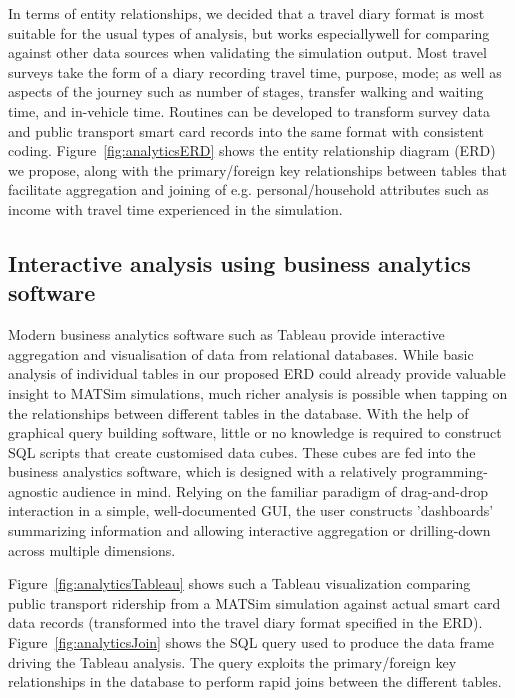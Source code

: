 In terms of entity relationships, we decided that a travel diary format is most suitable for the usual types of analysis, but works especiallywell for comparing against other data sources when validating the simulation output. Most travel surveys take the form of a diary recording travel time, purpose, mode; as well as aspects of the journey such as number of stages, transfer walking and waiting time, and in-vehicle time. Routines can be developed to transform survey data  and public transport smart card records into the same format with consistent coding. Figure~\ref{fig:analyticsERD} shows the entity relationship diagram (ERD) we propose, along with the primary/foreign key relationships between tables that facilitate aggregation and joining of e.g. personal/household attributes such as income with travel time experienced in the simulation.

\subsection{Interactive analysis using business analytics software}
Modern business analytics software such as Tableau \citep{Tableau_Webpage_2013} provide interactive aggregation and visualisation of data from relational databases. While basic analysis of individual tables in our proposed ERD could already provide valuable insight to MATSim simulations, much richer analysis is possible when tapping on the relationships between different tables in the database. With the help of graphical query building software, little  or no knowledge is required to construct SQL scripts that create customised data cubes. These cubes are fed into the business analystics software, which is designed with a relatively programming-agnostic audience in mind. Relying on the familiar paradigm of drag-and-drop interaction in a simple, well-documented GUI, the user constructs 'dashboards' summarizing information and allowing interactive aggregation or drilling-down across multiple dimensions.


Figure~\ref{fig:analyticsTableau} shows such a Tableau visualization comparing public transport ridership from a MATSim simulation against actual smart card data records (transformed into the travel diary format specified in the ERD). Figure~\ref{fig:analyticsJoin} shows the SQL query used to produce the data frame driving the Tableau analysis. The query exploits the primary/foreign key relationships in the database to perform rapid joins between the different tables.


